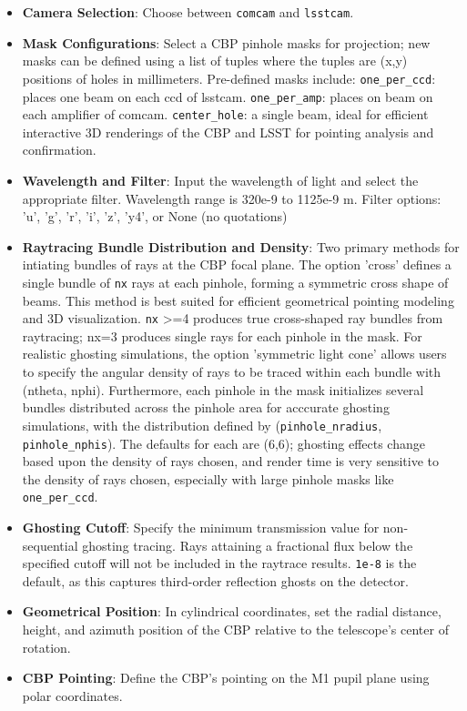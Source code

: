 \documentclass[SE,authoryear,toc]{lsstdoc}
\begin{document}
\begin{itemize}
    \item \textbf{Camera Selection}: Choose between \texttt{comcam} and \texttt{lsstcam}.
    \item \textbf{Mask Configurations}: Select a CBP pinhole masks for projection; new masks can be defined using a list of tuples where the tuples are (x,y) positions of holes in millimeters. Pre-defined masks include: \texttt{one\_per\_ccd}: places one beam on each ccd of lsstcam. \texttt{one\_per\_amp}: places on beam on each amplifier of comcam. \texttt{center\_hole}: a single beam, ideal for efficient interactive 3D renderings of the CBP and LSST for pointing analysis and confirmation.
    
    \item \textbf{Wavelength and Filter}: Input the wavelength of light and select the appropriate filter. Wavelength range is 320e-9 to 1125e-9 m. Filter options: 'u', 'g', 'r', 'i', 'z', 'y4', or None (no quotations)
    
    \item \textbf{Raytracing Bundle Distribution and  Density}: Two primary methods for intiating bundles of rays at the CBP focal plane. The option 'cross' defines a single bundle of \texttt{nx} rays at each pinhole, forming a symmetric cross shape of beams. This method is best suited for efficient geometrical pointing modeling and 3D visualization. \texttt{nx} >=4 produces true cross-shaped ray bundles from raytracing; nx=3 produces single rays for each pinhole in the mask. For realistic ghosting simulations, the option 'symmetric light cone' allows users to specify the angular density of rays to be traced within each bundle with (ntheta, nphi). Furthermore, each pinhole in the mask initializes several bundles distributed across the pinhole area for acccurate ghosting simulations, with the distribution defined by (\texttt{pinhole\_nradius}, \texttt{pinhole\_nphis}). The defaults for each are (6,6); ghosting effects change based upon the density of rays chosen, and render time is very sensitive to the density of rays chosen, especially with large pinhole masks like \texttt{one\_per\_ccd}. 

    \item \textbf{Ghosting Cutoff}: Specify the minimum transmission value for non-sequential ghosting tracing. Rays attaining a fractional flux below the specified cutoff will not be included in the raytrace results. \texttt{1e-8} is the default, as this captures third-order reflection ghosts on the detector.
    \item \textbf{Geometrical Position}: In cylindrical coordinates, set the radial distance, height, and azimuth position of the CBP relative to the telescope’s center of rotation.
    \item \textbf{CBP Pointing}: Define the CBP's pointing on the M1 pupil plane using polar coordinates.
    
\end{itemize}
\end{document}
